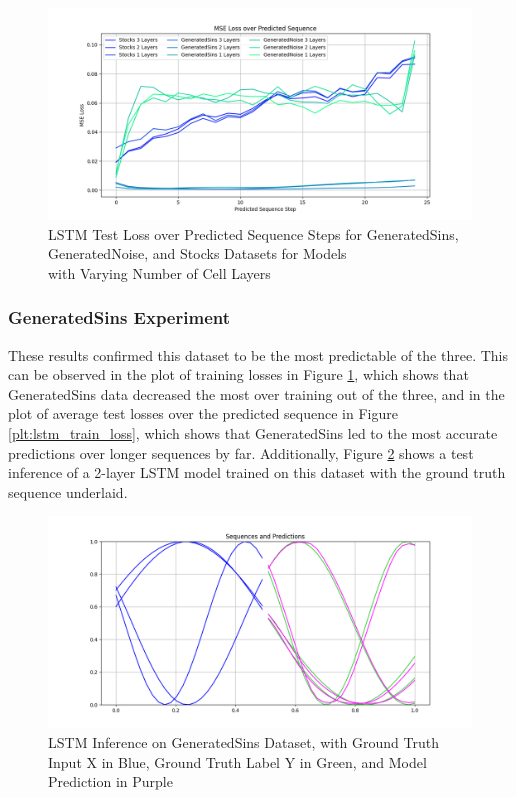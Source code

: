 \documentclass{scrartcl}
\begin{document}
\begin{figure}[H]
	\begin{center}
		\includegraphics[width=1\textwidth]{plots/linear_seq_loss.png}
	\end{center}
	\caption{LSTM Test Loss over Predicted Sequence Steps for GeneratedSins, \\ 
	GeneratedNoise, and Stocks Datasets for Models \\
	with Varying Number of Cell Layers}
	\label{plt:lstm_seq_loss}
\end{figure}

\subsubsection{GeneratedSins Experiment}
\label{subsubsec:generated_sins}

These results confirmed this dataset to be the most predictable of the three.
This can be observed in the plot of training losses in Figure
\ref{plt:lstm_seq_loss}, which shows that GeneratedSins data decreased the most
over training out of the three, and in the plot of average test losses over the
predicted sequence in Figure \ref{plt:lstm_train_loss}, which shows that
GeneratedSins led to the most accurate predictions over longer sequences by
far. Additionally, Figure \ref{plt:lstm_sins_inference} shows a test inference
of a 2-layer LSTM model trained on this dataset with the ground truth sequence
underlaid.  

\begin{figure}[H]
	\centering
	\includegraphics[width=1\textwidth]{plots/lstm_sins_inference.png}
	\caption{LSTM Inference on GeneratedSins Dataset, with Ground Truth Input X in Blue, Ground Truth Label Y in Green, and Model Prediction in Purple}
	\label{plt:lstm_sins_inference}
\end{figure}
\end{document}
